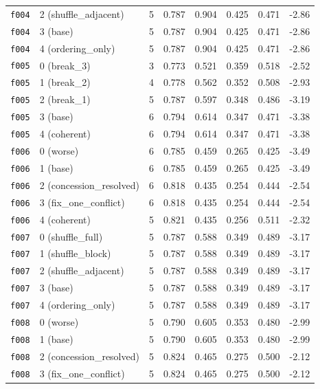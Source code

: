\documentclass[11pt]{article}
\begin{document}
\begin{table}[htbp]
\begin{tabular}{llrrrrrr}
\texttt{f004} & 2 (shuffle\_adjacent) & 5 & 0.787 & 0.904 & 0.425 & 0.471 & -2.86 \\
\texttt{f004} & 3 (base) & 5 & 0.787 & 0.904 & 0.425 & 0.471 & -2.86 \\
\texttt{f004} & 4 (ordering\_only) & 5 & 0.787 & 0.904 & 0.425 & 0.471 & -2.86 \\
\midrule
\texttt{f005} & 0 (break\_3) & 3 & 0.773 & 0.521 & 0.359 & 0.518 & -2.52 \\
\texttt{f005} & 1 (break\_2) & 4 & 0.778 & 0.562 & 0.352 & 0.508 & -2.93 \\
\texttt{f005} & 2 (break\_1) & 5 & 0.787 & 0.597 & 0.348 & 0.486 & -3.19 \\
\texttt{f005} & 3 (base) & 6 & 0.794 & 0.614 & 0.347 & 0.471 & -3.38 \\
\texttt{f005} & 4 (coherent) & 6 & 0.794 & 0.614 & 0.347 & 0.471 & -3.38 \\
\midrule
\texttt{f006} & 0 (worse) & 6 & 0.785 & 0.459 & 0.265 & 0.425 & -3.49 \\
\texttt{f006} & 1 (base) & 6 & 0.785 & 0.459 & 0.265 & 0.425 & -3.49 \\
\texttt{f006} & 2 (concession\_resolved) & 6 & 0.818 & 0.435 & 0.254 & 0.444 & -2.54 \\
\texttt{f006} & 3 (fix\_one\_conflict) & 6 & 0.818 & 0.435 & 0.254 & 0.444 & -2.54 \\
\texttt{f006} & 4 (coherent) & 5 & 0.821 & 0.435 & 0.256 & 0.511 & -2.32 \\
\midrule
\texttt{f007} & 0 (shuffle\_full) & 5 & 0.787 & 0.588 & 0.349 & 0.489 & -3.17 \\
\texttt{f007} & 1 (shuffle\_block) & 5 & 0.787 & 0.588 & 0.349 & 0.489 & -3.17 \\
\texttt{f007} & 2 (shuffle\_adjacent) & 5 & 0.787 & 0.588 & 0.349 & 0.489 & -3.17 \\
\texttt{f007} & 3 (base) & 5 & 0.787 & 0.588 & 0.349 & 0.489 & -3.17 \\
\texttt{f007} & 4 (ordering\_only) & 5 & 0.787 & 0.588 & 0.349 & 0.489 & -3.17 \\
\midrule
\texttt{f008} & 0 (worse) & 5 & 0.790 & 0.605 & 0.353 & 0.480 & -2.99 \\
\texttt{f008} & 1 (base) & 5 & 0.790 & 0.605 & 0.353 & 0.480 & -2.99 \\
\texttt{f008} & 2 (concession\_resolved) & 5 & 0.824 & 0.465 & 0.275 & 0.500 & -2.12 \\
\texttt{f008} & 3 (fix\_one\_conflict) & 5 & 0.824 & 0.465 & 0.275 & 0.500 & -2.12 \\

\end{tabular}
\end{table}
\end{document}
